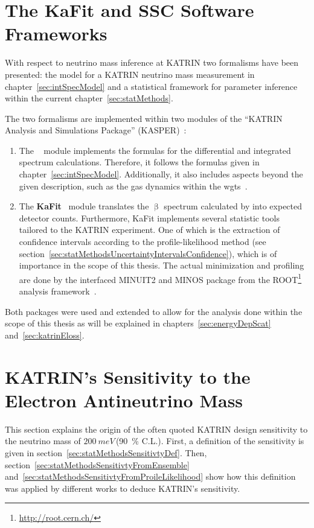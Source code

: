 \section{The KaFit and SSC Software Frameworks}
\label{sec:statMethodsKaFitSSC}
With respect to neutrino mass inference at KATRIN two formalisms have been presented: the model for a KATRIN neutrino mass measurement in chapter~\ref{sec:intSpecModel} and a statistical framework for parameter inference within the current chapter~\ref{sec:statMethods}.

The two formalisms are implemented within two modules of the ``KATRIN Analysis and Simulations Package'' (KASPER)~\cite{Kasper}:\mynobreakpar
\begin{enumerate}
	\item The \textbf{}~\cite{SSC} module implements the formulas for the differential and integrated spectrum calculations. Therefore, it follows the formulas given in chapter~\ref{sec:intSpecModel}. Additionally, it also includes aspects beyond the given description, such as the gas dynamics within the \gls{wgts}~\cite{Hoetzel2012, Groh2015, Kleesiek2019, Kaefer2012}.
	\item The \textbf{KaFit}~\cite{KaFit} module translates the $\upbeta$ spectrum calculated by  into expected detector counts. Furthermore, KaFit implements several statistic tools tailored to the KATRIN experiment. One of which is the extraction of confidence intervals according to the profile-likelihood method (see section~\ref{sec:statMethodsUncertaintyIntervalsConfidence}), which is of importance in the scope of this thesis. The actual minimization and profiling are done by the interfaced MINUIT2 and MINOS package from the ROOT\footnote{\url{http://root.cern.ch/}}~\cite{ANTCHEVA2009} analysis framework~\cite{Kleesiek2014}.
\end{enumerate}

Both packages were used and extended to allow for the analysis done within the scope of this thesis as will be explained in chapters~\ref{sec:energyDepScat} and~\ref{sec:katrinEloss}.

\section{KATRIN's Sensitivity to the Electron Antineutrino Mass}
\label{sec:statMethodsKatrinSensitivity}
This section explains the origin of the often quoted KATRIN design sensitivity to the neutrino mass of $\SI{200}{meV}$\,(\SI{90}{\percent} C.L.). First, a definition of the sensitivity is given in section~\ref{sec:statMethodsSensitivtyDef}. Then, section~\ref{sec:statMethodsSensitivtyFromEnsemble} and~\ref{sec:statMethodsSensitivtyFromProileLikelihood} show how this definition was applied by different works to deduce KATRIN's sensitivity.


